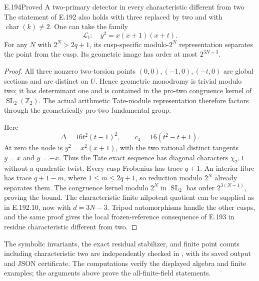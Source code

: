 \begin{result}{E.194}{Proved}
{A two-primary detector in every characteristic different from two}
The statement of E.192 also holds with three replaced by two and
with \(\operatorname{char}(k)\ne2\).  One can take the family
\[
                   \mathcal L_t:\quad y^2=x(x+1)(x+t).
\tag{E.194.1}
\]
For any \(N\) with \(2^N>2q+1\), its cusp-specific
modulo-\(2^N\) representation separates the point from the cusp.
Its geometric image has order at most \(2^{3N-3}\).
\end{result}

\begin{proof}
All three nonzero two-torsion points
\((0,0),(-1,0),(-t,0)\) are global sections and are distinct on
\(U\).  Hence geometric monodromy is trivial modulo two; it has
determinant one and is contained in the pro-two congruence kernel
of \(\operatorname{SL}_2(\mathbb Z_2)\).
The actual arithmetic Tate-module representation therefore factors
through the geometrically pro-two fundamental group.

Here
\[
 \Delta=16t^2(t-1)^2,\qquad c_4=16(t^2-t+1).
\tag{E.194.2}
\]
At zero the node is \(y^2=x^2(x+1)\), with the two rational distinct
tangents \(y=x\) and \(y=-x\).  Thus the Tate exact sequence has
diagonal characters \(\chi_2,1\) without a quadratic twist.
Every cusp Frobenius has trace \(q+1\).  An interior fibre has trace
\(q+1-m\), where \(1\le m\le2q+1\), so reduction modulo \(2^N\)
already separates them.  The congruence kernel modulo \(2^N\) in
\(\operatorname{SL}_2\) has order \(2^{3(N-1)}\), proving the bound.
The characteristic finite nilpotent quotient can be supplied as
in E.192.10, now with \(d=3N-3\).  Tripod automorphisms handle the
other cusps, and the same proof gives the local frozen-reference
consequence of E.193 in residue characteristic different from two.
\end{proof}

The symbolic invariants, the exact residual stabilizer, and finite
point counts including characteristic two are independently checked
in , with its saved output
and JSON certificate.  The computations verify the displayed
algebra and finite examples; the arguments above prove the
all-finite-field statements.

